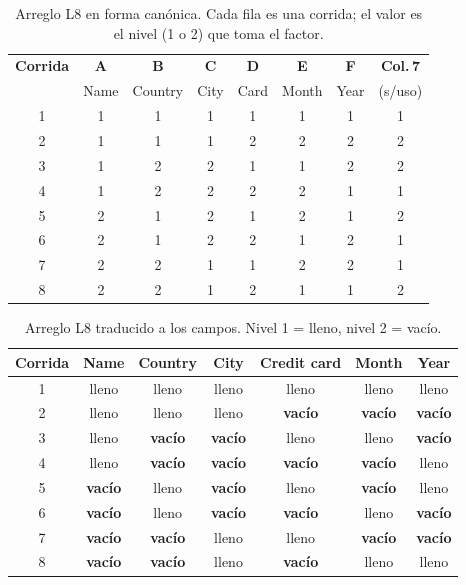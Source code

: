 \begingroup
\small
\renewcommand{\arraystretch}{1.2}
\begin{table}[htb]\centering\small
\caption{Arreglo L8 en forma canónica. Cada fila es una corrida; el valor es el nivel (1 o 2) que toma el factor.}\label{tab:l8-canonico}
\setlength{\tabcolsep}{6pt}
\begin{tabular}{c cccccc c}
\toprule
\textbf{Corrida} & \textbf{A} & \textbf{B} & \textbf{C} & \textbf{D} & \textbf{E} & \textbf{F} & \textbf{Col.\,7} \\
 & {\scriptsize Name} & {\scriptsize Country} & {\scriptsize City} & {\scriptsize Card} & {\scriptsize Month} & {\scriptsize Year} & {\scriptsize (s/uso)} \\
\midrule
1 & 1 & 1 & 1 & 1 & 1 & 1 & 1 \\
2 & 1 & 1 & 1 & 2 & 2 & 2 & 2 \\
3 & 1 & 2 & 2 & 1 & 1 & 2 & 2 \\
4 & 1 & 2 & 2 & 2 & 2 & 1 & 1 \\
5 & 2 & 1 & 2 & 1 & 2 & 1 & 2 \\
6 & 2 & 1 & 2 & 2 & 1 & 2 & 1 \\
7 & 2 & 2 & 1 & 1 & 2 & 2 & 1 \\
8 & 2 & 2 & 1 & 2 & 1 & 1 & 2 \\
\bottomrule
\end{tabular}
\end{table}
\endgroup

\begingroup
\small
\renewcommand{\arraystretch}{1.2}
\begin{table}[htb]\centering\small
\caption{Arreglo L8 traducido a los campos. Nivel 1 = lleno, nivel 2 = vacío.}\label{tab:l8-campos}
\setlength{\tabcolsep}{5pt}
\begin{tabular}{c cccccc}
\toprule
\textbf{Corrida} & \textbf{Name} & \textbf{Country} & \textbf{City} & \textbf{Credit card} & \textbf{Month} & \textbf{Year} \\
\midrule
1 & lleno & lleno & lleno & lleno & lleno & lleno \\
2 & lleno & lleno & lleno & \textbf{vacío} & \textbf{vacío} & \textbf{vacío} \\
3 & lleno & \textbf{vacío} & \textbf{vacío} & lleno & lleno & \textbf{vacío} \\
4 & lleno & \textbf{vacío} & \textbf{vacío} & \textbf{vacío} & \textbf{vacío} & lleno \\
5 & \textbf{vacío} & lleno & \textbf{vacío} & lleno & \textbf{vacío} & lleno \\
6 & \textbf{vacío} & lleno & \textbf{vacío} & \textbf{vacío} & lleno & \textbf{vacío} \\
7 & \textbf{vacío} & \textbf{vacío} & lleno & lleno & \textbf{vacío} & \textbf{vacío} \\
8 & \textbf{vacío} & \textbf{vacío} & lleno & \textbf{vacío} & lleno & lleno \\
\bottomrule
\end{tabular}
\end{table}
\endgroup

